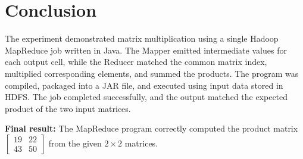 \documentclass[11pt,a4paper]{article}
\begin{document}
\section{Conclusion}
The experiment demonstrated matrix multiplication using a single Hadoop MapReduce job written in Java. The Mapper emitted intermediate values for each output cell, while the Reducer matched the common matrix index, multiplied corresponding elements, and summed the products. The program was compiled, packaged into a JAR file, and executed using input data stored in HDFS. The job completed successfully, and the output matched the expected product of the two input matrices.

\textbf{Final result:} The MapReduce program correctly computed the product matrix
$\begin{bmatrix}19&22\\43&50\end{bmatrix}$ from the given $2\times2$ matrices.
\end{document}
